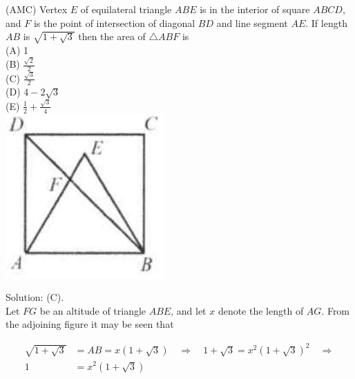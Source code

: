 \documentclass{article}
\begin{document}
(AMC) Vertex \(E\) of equilateral triangle \(A B E\) is in the interior of square \(A B C D\), and \(F\) is the point of intersection of diagonal \(B D\) and line segment \(A E\). If length \(A B\) is \(\sqrt{1+\sqrt{3}}\) then the area of \(\triangle A B F\) is\\
(A) 1\\
(B) \(\frac{\sqrt{2}}{2}\)\\
(C) \(\frac{\sqrt{3}}{2}\)\\
(D) \(4-2 \sqrt{3}\)\\
(E) \(\frac{1}{2}+\frac{\sqrt{3}}{4}\)\\
\centering
\includegraphics[width=\textwidth]{images/083.jpg}

Solution: (C).\\
Let \(F G\) be an altitude of triangle \(A B E\), and let \(x\) denote the length of \(A G\). From the adjoining figure it may be seen that

\[
\begin{aligned}
\sqrt{1+\sqrt{3}} & =A B=x(1+\sqrt{3}) \quad \Rightarrow \quad 1+\sqrt{3}=x^{2}(1+\sqrt{3})^{2} \quad \Rightarrow \\
1 & =x^{2}(1+\sqrt{3})
\end{aligned}
\]
\end{document}
